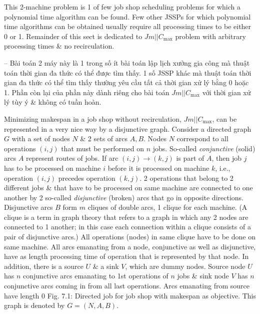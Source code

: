 \documentclass{article}
\begin{document}
\begin{itemize}
\begin{itemize}
        This 2-machine problem is 1 of few job shop scheduling problems for which a polynomial time algorithm can be found. Few other JSSPs for which polynomial time algorithms can be obtained usually require all processing times to be either 0 or 1. Remainder of this sect is dedicated to $Jm||C_{\max}$ problem with arbitrary processing times \& no recirculation.

        -- Bài toán 2 máy này là 1 trong số ít bài toán lập lịch xưởng gia công mà thuật toán thời gian đa thức có thể được tìm thấy. 1 số JSSP khác mà thuật toán thời gian đa thức có thể tìm thấy thường yêu cầu tất cả thời gian xử lý bằng 0 hoặc 1. Phần còn lại của phần này dành riêng cho bài toán $Jm||C_{\max}$ với thời gian xử lý tùy ý \& không có tuần hoàn.

        Minimizing makespan in a job shop without recirculation, $Jm||C_{\max}$, can be represented in a very nice way by a disjunctive graph. Consider a directed graph $G$ with a set of nodes $N$ \& 2 sets of arcs $A,B$. Nodes $N$ correspond to all operations $(i,j)$ that must be performed on $n$ jobs. So-called {\it conjunctive} (solid) arcs $A$ represent routes of jobs. If arc $(i,j)\to(k,j)$ is part of $A$, then job $j$ has to be processed on machine $i$ before it is processed on machine $k$, i.e., operation $(i,j)$ precedes operation $(k,j)$. 2 operations that belong to 2 different jobs \& that have to be processed on same machine are connected to one another by 2 so-called {\it disjunctive} (broken) arcs that go in opposite directions. Disjunctive arcs $B$ form $m$ cliques of double arcs, 1 clique for each machine. (A clique is a term in graph theory that refers to a graph in which any 2 nodes are connected to 1 another; in this case each connection within a clique consists of a pair of disjunctive arcs.) All operations (nodes) in same clique have to be done on same machine. All arcs emanating from a node, conjunctive as well as disjunctive, have as length processing time of operation that is represented by that node. In addition, there is a source $U$ \& a sink $V$, which are dummy nodes. Source node $U$ has $n$ conjunctive arcs emanating to 1st operations of $n$ jobs \& sink node $V$ has $n$ conjunctive arcs coming in from all last operations. Arcs emanating from source have length 0 {\sf Fig. 7.1: Directed job for job shop with makespan as objective}. This graph is denoted by $G = (N,A,B)$.


\end{itemize}
\end{itemize}
\end{document}

